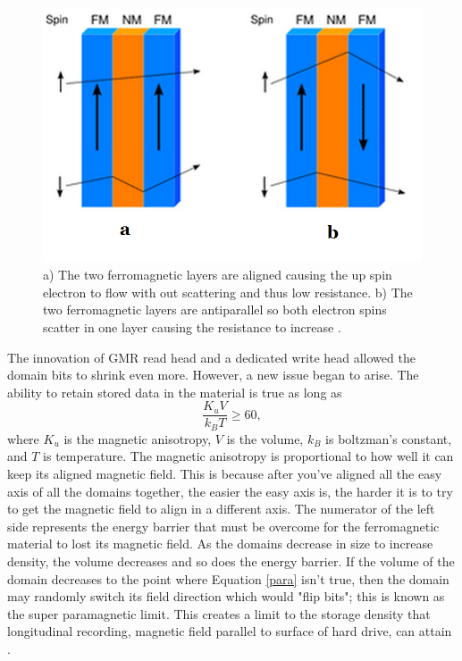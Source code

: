 \documentclass[ notitlepage, numerical, 11pt]{revtex4-1} %
\begin{document}
\begin{figure}[H]
\centerline{\includegraphics[scale=.45]{gmr2.png}}
\caption{a) The two ferromagnetic layers are aligned causing the up spin electron to flow with out scattering and thus low resistance. b) The two ferromagnetic layers are antiparallel so both electron spins scatter in one layer causing the resistance to increase \cite{gmr}.}
\label{gmr2}
\end{figure}


The innovation of GMR read head and a dedicated write head allowed the domain bits to shrink even more. However, a new issue began to arise. The ability to retain stored data in the material is true as long as 
\begin{equation}
\frac{K_uV}{k_BT} \geq 60,
\label{para}
\end{equation}
where $K_u$ is the magnetic anisotropy, $V$ is the volume, $k_B$ is boltzman's constant, and $T$ is temperature. The magnetic anisotropy is proportional to how well it can keep its aligned magnetic field. This is because after you've aligned all the easy axis of all the domains together, the easier the easy axis is, the harder it is to try to get the magnetic field to align in a different axis. The numerator of the left side represents the energy barrier that must be overcome for the ferromagnetic material to lost its magnetic field. As the domains decrease in size to increase density, the volume decreases and so does the energy barrier. If the volume of the domain decreases to the point where Equation \ref{para} isn't true, then the domain may randomly switch its field direction which would "flip bits"; this is known as the super paramagnetic limit. This creates a limit to the storage density that longitudinal recording, magnetic field parallel to surface of hard drive, can attain \cite{perpendicular}.
\end{document}
